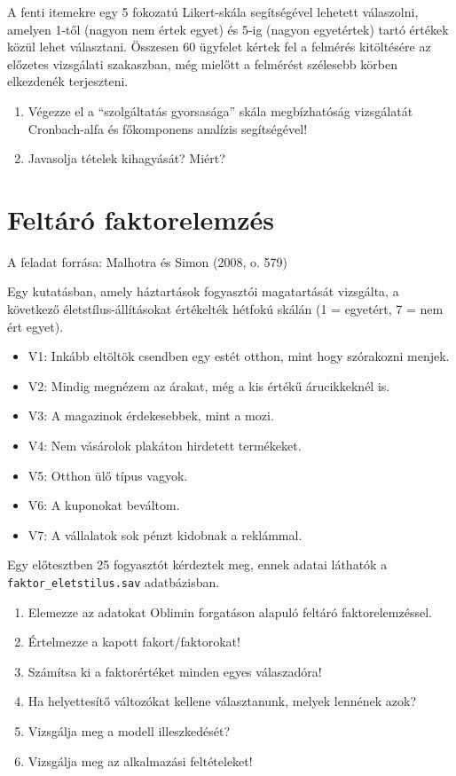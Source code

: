 \documentclass[
  letterpaper,
]{krantz}
\providecommand{\tightlist}{%
  \setlength{\itemsep}{0pt}\setlength{\parskip}{0pt}}\usepackage{longtable,booktabs,array}
\begin{document}
A fenti itemekre egy 5 fokozatú Likert-skála segítségével lehetett
válaszolni, amelyen 1-től (nagyon nem értek egyet) és 5-ig (nagyon
egyetértek) tartó értékek közül lehet választani. Összesen 60 ügyfelet
kértek fel a felmérés kitöltésére az előzetes vizsgálati szakaszban, még
mielőtt a felmérést szélesebb körben elkezdenék terjeszteni.

\begin{enumerate}
\def\labelenumi{\arabic{enumi}.}
\tightlist
\item
  Végezze el a ``szolgáltatás gyorsasága'' skála megbízhatóság
  vizsgálatát Cronbach-alfa és főkomponens analízis segítségével!
\item
  Javasolja tételek kihagyását? Miért?
\end{enumerate}

\hypertarget{feltuxe1ruxf3-faktorelemzuxe9s-1}{%
\chapter{Feltáró faktorelemzés}\label{feltuxe1ruxf3-faktorelemzuxe9s-1}}

A feladat forrása: Malhotra és Simon (2008, o. 579)

Egy kutatásban, amely háztartások fogyasztói magatartását vizsgálta, a
következő életstílus-állításokat értékelték hétfokú skálán (1 =
egyetért, 7 = nem ért egyet).

\begin{itemize}
\tightlist
\item
  V1: Inkább eltöltök csendben egy estét otthon, mint hogy szórakozni
  menjek.
\item
  V2: Mindig megnézem az árakat, még a kis értékű árucikkeknél is.
\item
  V3: A magazinok érdekesebbek, mint a mozi.
\item
  V4: Nem vásárolok plakáton hirdetett termékeket.
\item
  V5: Otthon ülő típus vagyok.
\item
  V6: A kuponokat beváltom.
\item
  V7: A vállalatok sok pénzt kidobnak a reklámmal.
\end{itemize}

Egy előtesztben 25 fogyasztót kérdeztek meg, ennek adatai láthatók a
\texttt{faktor\_eletstilus.sav} adatbázisban.

\begin{enumerate}
\def\labelenumi{\arabic{enumi}.}
\tightlist
\item
  Elemezze az adatokat Oblimin forgatáson alapuló feltáró
  faktorelemzéssel.
\item
  Értelmezze a kapott fakort/faktorokat!
\item
  Számítsa ki a faktorértéket minden egyes válaszadóra!
\item
  Ha helyettesítő változókat kellene választanunk, melyek lennének azok?
\item
  Vizsgálja meg a modell illeszkedését?
\item
  Vizsgálja meg az alkalmazási feltételeket!
\end{enumerate}
\end{document}
